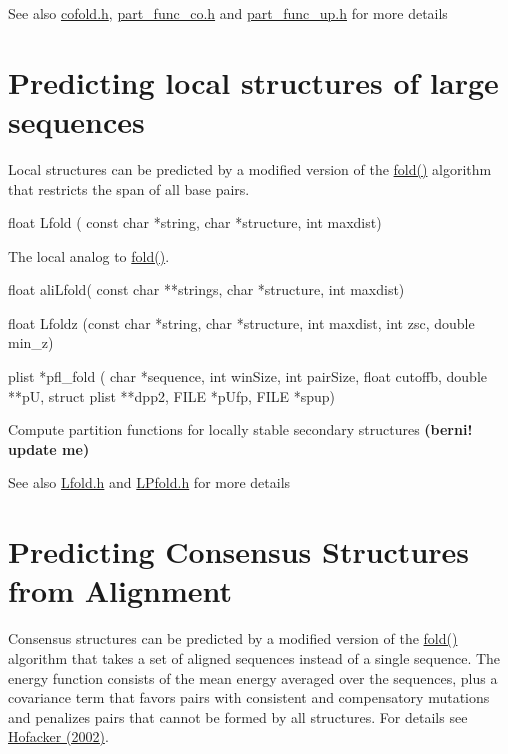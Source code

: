 \begin{DoxySeeAlso}{See also}
\hyperlink{cofold_8h}{cofold.h}, \hyperlink{part__func__co_8h}{part\_\-func\_\-co.h} and \hyperlink{part__func__up_8h}{part\_\-func\_\-up.h} for more details
\end{DoxySeeAlso}
\hypertarget{mp__fold_mp_Local_Fold}{}\section{Predicting local structures of large sequences}\label{mp__fold_mp_Local_Fold}
Local structures can be predicted by a modified version of the \hyperlink{fold_8h_aadafcb0f140795ae62e5ca027e335a9b}{fold()} algorithm that restricts the span of all base pairs.

\begin{DoxyVerb}
float Lfold ( const char *string,
              char *structure,
              int maxdist)
\end{DoxyVerb}
 The local analog to \hyperlink{fold_8h_aadafcb0f140795ae62e5ca027e335a9b}{fold()}. 

\begin{DoxyVerb}
float aliLfold( const char **strings,
                char *structure,
                int maxdist)
\end{DoxyVerb}
 

\begin{DoxyVerb}
float Lfoldz (const char *string,
              char *structure,
              int maxdist,
              int zsc,
              double min_z)
\end{DoxyVerb}
 

\begin{DoxyVerb}
plist *pfl_fold (
            char *sequence,
            int winSize,
            int pairSize,
            float cutoffb,
            double **pU,
            struct plist **dpp2,
            FILE *pUfp,
            FILE *spup)
\end{DoxyVerb}
 Compute partition functions for locally stable secondary structures {\bfseries (berni! update me)} 

\begin{DoxySeeAlso}{See also}
\hyperlink{Lfold_8h}{Lfold.h} and \hyperlink{LPfold_8h}{LPfold.h} for more details
\end{DoxySeeAlso}
\hypertarget{mp__fold_mp_Alignment_Fold}{}\section{Predicting Consensus Structures from Alignment}\label{mp__fold_mp_Alignment_Fold}
Consensus structures can be predicted by a modified version of the \hyperlink{fold_8h_aadafcb0f140795ae62e5ca027e335a9b}{fold()} algorithm that takes a set of aligned sequences instead of a single sequence. The energy function consists of the mean energy averaged over the sequences, plus a covariance term that favors pairs with consistent and compensatory mutations and penalizes pairs that cannot be formed by all structures. For details see \hyperlink{mp__ref_hofacker_02}{Hofacker (2002)}.


